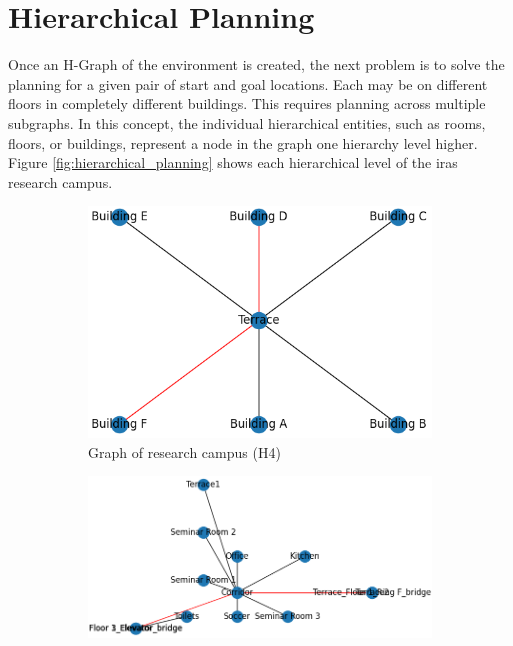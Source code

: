\section{Hierarchical Planning}
\label{sec:hierarchical_planning_method}
Once an H-Graph of the environment is created, the next problem is to solve the planning for a given pair of start and goal locations. Each may be on different floors in completely different buildings. This requires planning across multiple subgraphs. In this concept, the individual hierarchical entities, such as rooms, floors, or buildings, represent a node in the graph one hierarchy level higher. Figure \ref{fig:hierarchical_planning} shows each hierarchical level of the \gls{iras} research campus.

\begin{figure}[htb]
    \captionsetup[subfigure]{justification=centering}
    \centering
    \begin{subfigure}{.4\textwidth}
      \centering
      \includegraphics[width=\textwidth]{figures/40_concept/ltc_graph_campus.png}
      \caption{Graph of research campus (H4)}
    \end{subfigure}%
    \begin{subfigure}{.6\textwidth}
      \centering
      \includegraphics[width=\textwidth]{figures/40_concept/ltc_graph_floor_2.png}

\end{subfigure}
\end{figure}

